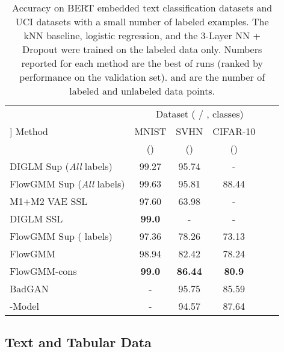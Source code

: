 \documentclass{article}
\newcommand{\method}{FlowGMM\xspace}
\newcommand{\methodcons}{FlowGMM-cons\xspace}
\begin{document}
\begin{table*}[t]
	\centering
	\caption{
	Accuracy on BERT embedded text classification datasets and UCI datasets with a small number of labeled examples. The kNN baseline, logistic regression, and the 3-Layer NN + Dropout were trained on the labeled data only. Numbers reported for each method are the best of  runs (ranked by performance on the validation set).  and  are the number of labeled and unlabeled data points.
    }
	\label{tab:ssl_tab}
	\small
	\begin{tabular}{lccccc}
	    & \multicolumn{4}{c}{Dataset ( / , classes)}  \\
        \cmidrule(r){2-5}
	    \-0.3cm]
		Method                    & MNIST  
                                  & SVHN  
                                  & CIFAR-10 \\
                                  & () 
                                  & ()
                                  & ()\\
       \midrule
        DIGLM Sup (\textit{All} labels)        & 99.27         & 95.74         & -             \\
        \method Sup (\textit{All} labels)      & 99.63         & 95.81         & 88.44         \\
		\midrule
		M1+M2 VAE SSL          & 97.60         & 63.98         & -          \\
		DIGLM SSL              & \textbf{99.0}         & -             & -          \\
        \method Sup ( labels)         & 97.36         & 78.26         & 73.13         \\
        \method                & 98.94         & 82.42         & 78.24         \\
        \methodcons            & \textbf{99.0} & \textbf{86.44}& \textbf{80.9} \\
        \midrule
        BadGAN & - & 95.75 & 85.59\\
        -Model & - & 94.57 & 87.64\\
        
	\end{tabular}
	\vspace{-.3cm}
\end{table*}

\subsection{Text and Tabular Data}
\label{sec:exp_tab}
\end{document}
